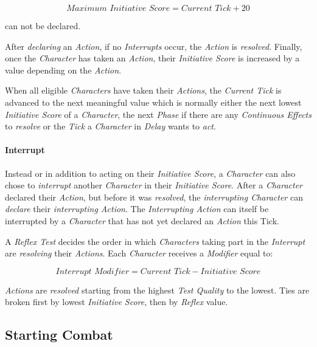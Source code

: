 \begin{equation}
    \textit{Maximum Initiative Score} = \textit{Current Tick} + 20
\end{equation}

can not be declared.

After \emph{declaring} an \emph{Action}, if no \emph{Interrupts} occur, the
\emph{Action} is \emph{resolved}. Finally, once the \emph{Character} has taken an
\emph{Action}, their \emph{Initiative Score} is increased by a value
depending on the \emph{Action}.

When all eligible \emph{Characters} have taken their \emph{Actions}, the
\emph{Current Tick} is advanced to the next meaningful value which is normally
either the next lowest \emph{Initiative Score} of a \emph{Character}, the next
\emph{Phase} if there are any \emph{Continuous Effects} to \emph{resolve} or the
\emph{Tick} a \emph{Character} in \emph{Delay} wants to \emph{act}.


\paragraph{Interrupt}
Instead or in addition to acting on their \emph{Initiative Score}, a \emph{Character}
can also chose to \emph{interrupt} another \emph{Character} in their
\emph{Initiative Score}. After a \emph{Character} declared their \emph{Action},
but before it was \emph{resolved}, the \emph{interrupting Character} can 
\emph{declare} their \emph{interrupting Action}.
The \emph{Interrupting Action} can itself be interrupted by a
\emph{Character} that has not yet declared an \emph{Action} this Tick.

A \emph{Reflex Test} decides the order in which \emph{Characters} taking part in
the \emph{Interrupt} are \emph{resolving} their \emph{Actions}. Each \emph{Character} 
receives a \emph{Modifier} equal to:

\begin{equation}
    \textit{Interrupt Modifier} = \textit{Current Tick} - \textit{Initiative Score}
\end{equation}

\emph{Actions} are \emph{resolved} starting from the highest \emph{Test Quality} 
to the lowest. Ties are broken first by lowest \emph{Initiative Score}, then by 
\emph{Reflex} value.


\subsection{Starting Combat}

